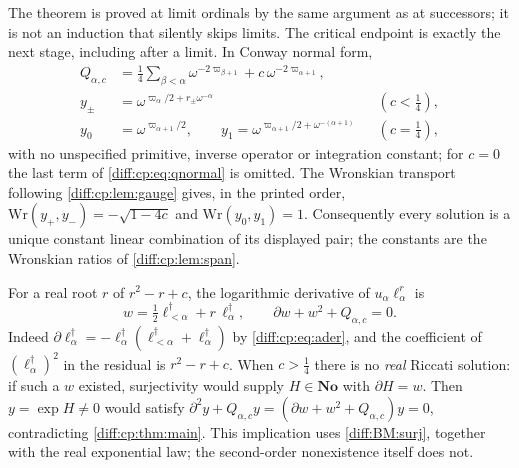 \documentclass[11pt,letterpaper]{article}
\numberwithin{equation}{section}
\theoremstyle{definition}
\theoremstyle{remark}
\newcommand{\No}{\mathbf{No}}
\newcommand{\der}{\partial}
\begin{document}
The theorem is proved at limit ordinals by the same argument as at successors;
it is not an induction that silently skips limits. The critical endpoint is
exactly the next stage, including after a limit. In Conway normal form,
\begin{align}
 Q_{\alpha,c}&=\frac14\sum_{\beta<\alpha}\omega^{-2\varpi_{\beta+1}}
 +c\,\omega^{-2\varpi_{\alpha+1}},\label{diff:cp:eq:qnormal}\\
 y_{\pm}&=\omega^{\varpi_{\alpha}/2+r_{\pm}\omega^{-\alpha}}
 &&(c<\tfrac14),\label{diff:cp:eq:ynormal}\\
 y_{0}&=\omega^{\varpi_{\alpha+1}/2},\qquad
 y_{1}=\omega^{\varpi_{\alpha+1}/2+\omega^{-(\alpha+1)}}
 &&(c=\tfrac14),\label{diff:cp:eq:ycrit}
\end{align}
with no unspecified primitive, inverse operator or integration constant; for
$c=0$ the last term of \cref{diff:cp:eq:qnormal} is omitted. The Wronskian transport following \cref{diff:cp:lem:gauge} gives,
in the printed order,
$\mathrm{Wr}(y_{+},y_{-})=-\sqrt{1-4c}$ and
$\mathrm{Wr}(y_{0},y_{1})=1$. Consequently every solution is a
unique constant linear combination of its displayed pair; the
constants are the Wronskian ratios of \cref{diff:cp:lem:span}.

\begin{remark}
\label{diff:cp:rem:riccati}
For a real root $r$ of $r^{2}-r+c$, the logarithmic derivative of
$u_{\alpha}\ell_{\alpha}^{r}$ is
\begin{equation}\label{diff:cp:eq:riccati}
 w=\tfrac12\ell_{<\alpha}^{\dagger}+r\,\ell_{\alpha}^{\dagger},
 \qquad \der w+w^{2}+Q_{\alpha,c}=0 .
\end{equation}
Indeed $\der\ell_{\alpha}^{\dagger}=-\ell_{\alpha}^{\dagger}(\ell_{<\alpha}^{\dagger}
+\ell_{\alpha}^{\dagger})$ by \cref{diff:cp:eq:ader}, and the coefficient of
$(\ell_{\alpha}^{\dagger})^{2}$ in the residual is $r^{2}-r+c$. When
$c>\frac14$ there is no \emph{real} Riccati solution: if such a
$w$ existed, surjectivity would supply $H\in\No$ with $\der H=w$.
Then $y=\exp H\neq0$ would satisfy
$\der^{2}y+Q_{\alpha,c}y=(\der w+w^{2}+Q_{\alpha,c})y=0$,
contradicting \cref{diff:cp:thm:main}. This implication uses
\ref{diff:BM:surj}, together with the real exponential law;
the second-order nonexistence itself does not.
\end{remark}
\end{document}
